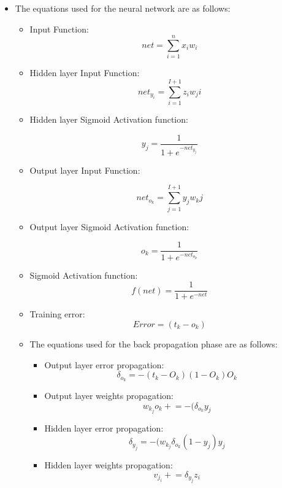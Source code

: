 	\begin{itemize}
		\item The equations used for the neural network are as follows:
		\begin{itemize}
			\item Input Function:
			 \[net =\sum_{i=1}^{n} {x_i} {w_i}\]
			 
			 \item Hidden layer Input Function:
			  \[net_{y_i} =\sum_{i=1}^{I + 1} {z_i}{w_ji}\]
			  
			  \item Hidden layer Sigmoid Activation function:
			  
			  \[y_j =\frac{1}{1 + {e}^{-net_{y_j}}}\]
			  
			   \item Output layer Input Function:
			  
			  \[net_{o_k} =\sum_{j=1}^{I + 1} {y_j}{w_kj}\]
			  
			  \item Output layer Sigmoid Activation function:
			  
			  \[o_k =\frac{1}{1 + {e}^{-net_{o_k}}}\]			  
			
			\item Sigmoid Activation function: \[f(net) =\frac{1}{1 + {e}^{-net}}\]
			
			\item Training error: \[Error =(t_k - o_k)\]
			
			

		\end{itemize}
		
		\begin{itemize}
		\item The equations used for the back propagation phase are as follows:
			\begin{itemize}
				\item Output layer error propagation:
				 \[\delta_{o_k} = -(t_k - O_k)(1 - O_k)O_k\]
				 
				 \item Output layer weights propagation:
				 \[w_{k_j}{o_k} \mathrel{+}= -(\delta_{o_k}y_j\]

				 \item Hidden layer error propagation:
				 \[\delta_{y_j} = -(w_{k_j} \delta_{o_k} (1-y_j)y_j\]				 
				 
				 \item Hidden layer weights propagation:
				 \[v_{j_i} \mathrel{+}= \delta_{y_j}z_i\]
				 

			\end{itemize}
		\end{itemize}
	
	\end{itemize}
	
